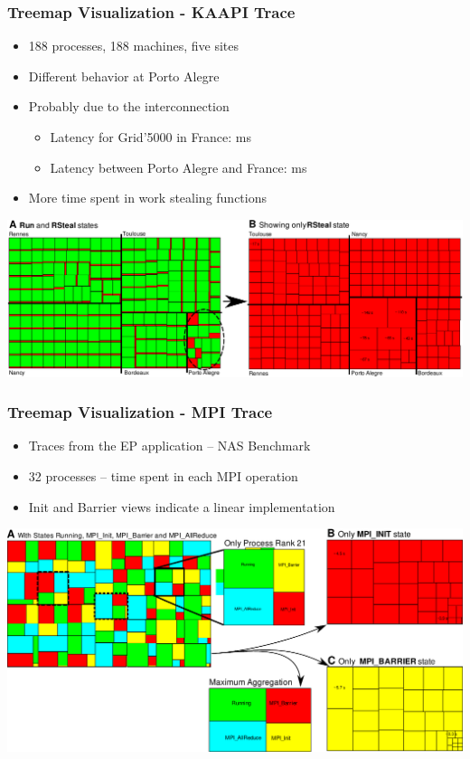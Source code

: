 \frame
{
   \frametitle{Treemap Visualization - KAAPI Trace}

   \begin{itemize}
   \item 188 processes, 188 machines, five sites
   \item Different behavior at Porto Alegre
   \item Probably due to the interconnection
      \begin{itemize}
      \item Latency for Grid'5000 in France:  ms
      \item Latency between Porto Alegre and France:  ms
      \end{itemize}
   \item More time spent in work stealing functions
   \end{itemize}

   \vfill
   \includegraphics[width=\textwidth]{img/kaapi-scenario-d.pdf}
}

\frame
{
   \frametitle{Treemap Visualization - MPI Trace}

   \begin{itemize}
   \item Traces from the EP application -- NAS Benchmark
   \item 32 processes -- time spent in each MPI operation
   \item Init and Barrier views indicate a linear implementation
   \end{itemize}

   \vfill
   \includegraphics[width=\textwidth]{img/mpi-scenario.pdf}
}
